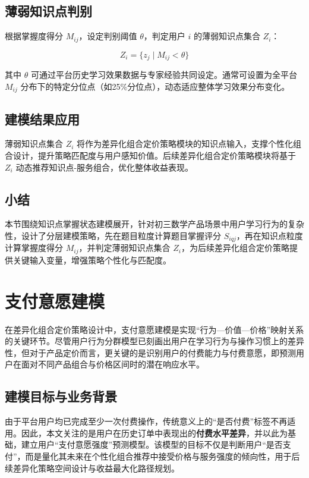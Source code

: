 \subsection{薄弱知识点判别}

根据掌握度得分 $M_{ij}$，设定判别阈值 $\theta$，判定用户 $i$ 的薄弱知识点集合 $Z_i$：

\begin{equation}
Z_i = \{ z_j \mid M_{ij} < \theta \}
\end{equation}

其中 $\theta$ 可通过平台历史学习效果数据与专家经验共同设定。通常可设置为全平台 $M_{ij}$ 分布下的特定分位点（如25\%分位点），动态适应整体学习效果分布变化。

\subsection{建模结果应用}

薄弱知识点集合 $Z_i$ 将作为差异化组合定价策略模块的知识点输入，支撑个性化组合设计，提升策略匹配度与用户感知价值。后续差异化组合定价策略模块将基于 $Z_i$ 动态推荐知识点-服务组合，优化整体收益表现。

\subsection*{小结}

本节围绕知识点掌握状态建模展开，针对初三数学产品场景中用户学习行为的复杂性，设计了分层建模策略，先在题目粒度计算题目掌握评分 $S_{iqj}$，再在知识点粒度计算掌握度得分 $M_{ij}$，并判定薄弱知识点集合 $Z_i$，为后续差异化组合定价策略提供关键输入变量，增强策略个性化与匹配度。


\section{支付意愿建模}
\label{sec:支付意愿建模}

在差异化组合定价策略设计中，支付意愿建模是实现“行为—价值—价格”映射关系的关键环节。尽管用户行为分群模型已刻画出用户在学习行为与操作习惯上的差异性，但对于产品定价而言，更关键的是识别用户的付费能力与付费意愿，即预测用户在面对不同产品组合与价格区间时的潜在响应水平。

\subsection{建模目标与业务背景}

由于平台用户均已完成至少一次付费操作，传统意义上的“是否付费”标签不再适用。因此，本文关注的是用户在历史订单中表现出的\textbf{付费水平差异}，并以此为基础，建立用户“支付意愿强度”预测模型。该模型的目标不仅是判断用户“是否支付”，而是量化其未来在个性化组合推荐中接受价格与服务强度的倾向性，用于后续差异化策略空间设计与收益最大化路径规划。

